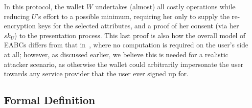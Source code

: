 \documentclass[runningheads]{llncs}
\begin{document}
In this protocol, the wallet $W$ undertakes (almost) all costly operations while reducing $U$'s effort to a possible minimum, requiring her only to supply the re-encryption keys for the selected attributes, and a proof of her consent (via her $sk_U$) to the presentation process.
This last proof is also how the overall model of EABCs differs from that in~\cite{towardsEABC}, where no computation is required on the user's side at all;
however, as discussed earlier, we believe this is needed for a realistic attacker scenario, as otherwise the wallet could arbitrarily impersonate the user towards any service provider that the user ever signed up for.



\subsection{Formal Definition}
\label{s:EABCsyntax}
\end{document}
